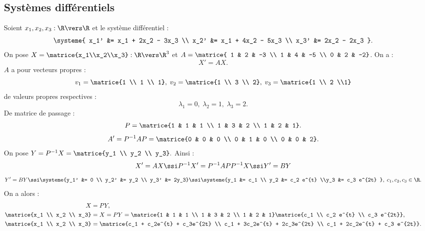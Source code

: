 \subsection{Systèmes différentiels}
Soient $x_1,x_2,x_3 : \R \vers \R$ et le système différentiel : \[ \systeme{ 
x_1' &= x_1 + 2x_2 - 3x_3 \\
x_2' &= x_1 + 4x_2 - 5x_3 \\
x_3' &= 2x_2 - 2x_3
}.\] 
On pose $X = \matrice{x_1\\x_2\\x_3} : \R \vers \R^{3}$ et $A = \matrice{ 1  & 2 & -3 \\ 1 & 4 & -5 \\ 0 & 2 & -2}$. On a : \[ X' = AX. \]
$A$ a pour vecteurs propres : \[ v_1 = \matrice{1 \\ 1 \\ 1}, \; v_2 = \matrice{1 \\ 3 \\ 2}, \; v_3 = \matrice{1 \\ 2 \\1}\] de valeurs propres respectives : \[\lambda_1 = 0, \; \lambda_2 = 1 , \; \lambda_3 = 2. \]De matrice de passage : \[ P = \matrice{1 & 1 & 1 \\ 1 & 3 & 2 \\ 1 & 2 & 1}. \] \[A' = P^{-1}AP = \matrice{0 & 0 & 0 \\ 0 & 1 & 0 \\ 0 & 0 & 2}. \] On pose $Y = P^{-1}X = \matrice{y_1 \\ y_2 \\ y_3}.$ Ainsi :\[ X' = AX \ssi P^{-1}X' = P^{-1}APP^{-1}X \ssi Y' = BY\] \[ Y' = BY \ssi \systeme{y_1' &= 0 \\ y_2' &= y_2 \\ y_3' &= 2y_3} \ssi \systeme{y_1 &= c_1 \\ y_2 &= c_2 e^{t} \\y_3 &= c_3 e^{2t} }, \; c_1,c_2,c_3 \in \R.\]On a alors : 
\begin{align*}
X &= PY, \\
\matrice{x_1 \\ x_2 \\ x_3} &= X = PY = \matrice{1 & 1 & 1 \\ 1 & 3 & 2 \\ 1 & 2 & 1}\matrice{c_1 \\ c_2 e^{t} \\ c_3 e^{2t}}, \\
\matrice{x_1 \\ x_2 \\ x_3} &= \matrice{c_1 + c_2e^{t} + c_3e^{2t} \\ c_1 + 3c_2e^{t} + 2c_3e^{2t} \\ c_1 + 2c_2e^{t} + c_3 e^{2t}}.
\end{align*}

